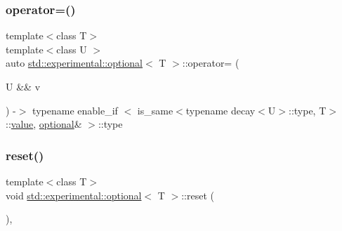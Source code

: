 \mbox{\label{classstd_1_1experimental_1_1optional_a7234fc6703bf072bef7abd51ae6ea81f}} 
\subsubsection{\texorpdfstring{operator=()}{operator=()}\hspace{0.1cm}{\footnotesize\ttfamily [4/4]}}
{\footnotesize\ttfamily template$<$class T$>$ \\
template$<$class U $>$ \\
auto \hyperlink{classstd_1_1experimental_1_1optional}{std\+::experimental\+::optional}$<$ T $>$\+::operator= (\begin{DoxyParamCaption}\item[{U \&\&}]{v }\end{DoxyParamCaption}) -\/$>$ typename enable\+\_\+if
                $<$
                    is\+\_\+same$<$typename decay$<$U$>$\+::type, T$>$\+::\hyperlink{classstd_1_1experimental_1_1optional_ad1277f09c288255dfe102b72e7107be6}{value},
                    \hyperlink{classstd_1_1experimental_1_1optional}{optional}\&
                $>$\+::type
            \hspace{0.3cm}{\ttfamily [inline]}}

\mbox{\label{classstd_1_1experimental_1_1optional_a6ce77ba1776c86de36a5ae1d16dfd80f}} 
\subsubsection{\texorpdfstring{reset()}{reset()}}
{\footnotesize\ttfamily template$<$class T$>$ \\
void \hyperlink{classstd_1_1experimental_1_1optional}{std\+::experimental\+::optional}$<$ T $>$\+::reset (\begin{DoxyParamCaption}{ }\end{DoxyParamCaption})\hspace{0.3cm}{\ttfamily [inline]}, {\ttfamily [noexcept]}}

\mbox{\label{classstd_1_1experimental_1_1optional_ad1173a269b43cd9ed55930c3eed0a4dd}} 
